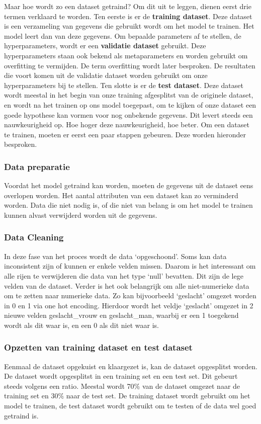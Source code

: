 Maar hoe wordt zo een dataset getraind?
Om dit uit te leggen, dienen eerst drie termen verklaard te worden. Ten eerste is er de \textbf{training dataset}. Deze dataset is een verzameling van gegevens die gebruikt wordt om het model te trainen. Het model leert dan van deze gegevens. Om bepaalde parameters af te stellen, de hyperparameters, wordt er een \textbf{validatie dataset} gebruikt. Deze hyperparameters staan ook bekend als metaparameters en worden gebruikt om overfitting te vermijden. De term overfitting wordt later besproken. De resultaten die voort komen uit de validatie dataset worden gebruikt om onze hyperparameters bij te stellen. Ten slotte is er de \textbf{test dataset}. Deze dataset wordt meestal in het begin van onze training afgesplitst van de originele dataset, en wordt na het trainen op ons model toegepast, om te kijken of onze dataset een goede hypothese kan vormen voor nog onbekende gegevens. Dit levert steeds een nauwkeurigheid op. Hoe hoger deze nauwkeurigheid, hoe beter. \autocite{Shah2017} Om een dataset te trainen, moeten er eerst een paar stappen gebeuren. Deze worden hieronder besproken. 

\subsubsection{Data preparatie}
\label{sec:datapreparatie}
Voordat het model getraind kan worden, moeten de gegevens uit de dataset eens overlopen worden. Het aantal attributen van een dataset kan zo verminderd worden. Data die niet nodig is, of die niet van belang is om het model te trainen kunnen alvast verwijderd worden uit de gegevens. 

\subsubsection{Data Cleaning}
\label{sec:datacleaning}
In deze fase van het proces wordt de data ‘opgeschoond’. Soms kan data inconsistent zijn of kunnen er enkele velden missen. Daarom is het interessant om alle rijen te verwijderen die data van het type ‘null’ bevatten. Dit zijn de lege velden van de dataset. Verder is het ook belangrijk om alle niet-numerieke data om te zetten naar numerieke data. Zo kan bijvoorbeeld ‘geslacht’ omgezet worden in 0 en 1 via one hot encoding. Hierdoor wordt het veldje ‘geslacht’ omgezet in 2 nieuwe velden geslacht\_vrouw en geslacht\_man, waarbij er een 1 toegekend wordt als dit waar is, en een 0 als dit niet waar is. 

\subsubsection{Opzetten van training dataset en test dataset}
\label{sec:opzetten}
Eenmaal de dataset opgekuist en klaargezet is, kan de dataset opgesplitst worden. De dataset wordt opgesplitst in een training set en een test set. Dit gebeurt steeds volgens een ratio. Meestal wordt 70\% van de dataset omgezet naar de training set en 30\% naar de test set. De training dataset wordt gebruikt om het model te trainen, de test dataset wordt gebruikt om te testen of de data wel goed getraind is. 

